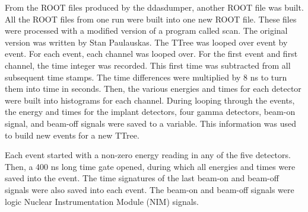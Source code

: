 \documentclass[../MaxHughesThesis.tex]{subfiles}
\begin{document}
From the ROOT files produced by the ddasdumper, another ROOT file was built.
All the ROOT files from one run were built into one new ROOT file. 
These files were processed with a modified version of a program called scan.
The original version was written by Stan Paulauskas.
The TTree was looped over event by event.
For each event, each channel was looped over. 
For the first event and first channel, the time integer was recorded. 
This first time was subtracted from all subsequent time stamps.
The time differences were multiplied by 8 ns to turn them into time in seconds. 
Then, the various energies and times for each detector were built into histograms for each channel. 
During looping through the events, the energy and times for the implant detectors, four gamma detectors, beam-on signal, and beam-off signals were saved to a variable.
This information was used to build new events for a new TTree.

Each event started with a non-zero energy reading in any of the five detectors.
Then, a 400 ns long time gate opened, during which all energies and times were saved into the event.
The time signatures of the last beam-on and beam-off signals were also saved into each event.
The beam-on and beam-off signals were logic Nuclear Instrumentation Module (NIM) signals.


\end{document}
